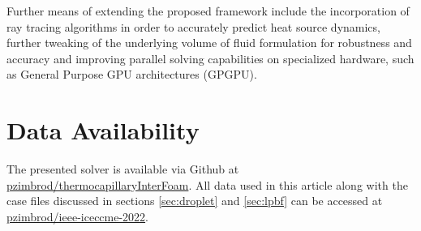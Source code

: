 \documentclass[conference,final]{IEEEtran}
\begin{document}
Further means of extending the proposed framework include the incorporation of ray tracing algorithms in order to accurately predict heat source dynamics, further tweaking of the underlying volume of fluid formulation for robustness and accuracy and improving parallel solving capabilities on specialized hardware, such as General Purpose GPU architectures (GPGPU).

\section{Data Availability}\label{sec:data}

The presented solver is available via Github at \href{https://github.com/pzimbrod/thermocapillaryInterFoam}{pzimbrod/thermocapillaryInterFoam}. All data used in this article along with the case files discussed in sections \ref{sec:droplet} and \ref{sec:lpbf} can be accessed at \href{https://github.com/pzimbrod/ieee-iceccme-2022}{pzimbrod/ieee-iceccme-2022}.



\end{document}
